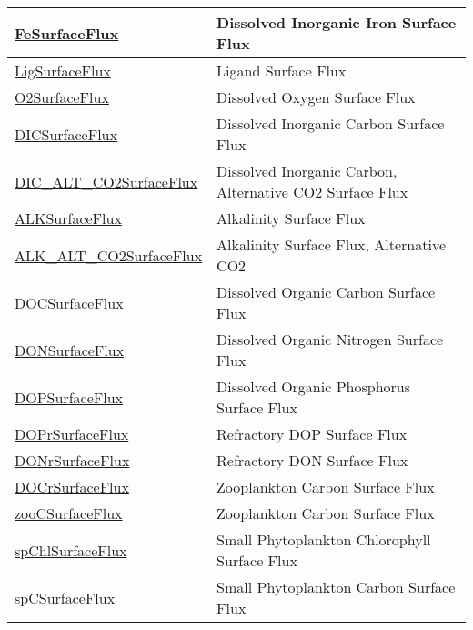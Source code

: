 {\begin{center}
\begin{longtable}{| p{2.0in} | p{4.0in} |}
    \hline
    \hyperref[subsec:var_sec_forcing_FeSurfaceFlux]{FeSurfaceFlux} & Dissolved Inorganic Iron Surface Flux \\
    \hline
    \hyperref[subsec:var_sec_forcing_LigSurfaceFlux]{LigSurfaceFlux} & Ligand Surface Flux \\
    \hline
    \hyperref[subsec:var_sec_forcing_O2SurfaceFlux]{O2SurfaceFlux} & Dissolved Oxygen Surface Flux \\
    \hline
    \hyperref[subsec:var_sec_forcing_DICSurfaceFlux]{DICSurfaceFlux} & Dissolved Inorganic Carbon Surface Flux \\
    \hline
    \hyperref[subsec:var_sec_forcing_DIC_ALT_CO2SurfaceFlux]{DIC\_ALT\_CO2SurfaceFlux} & Dissolved Inorganic Carbon, Alternative CO2 Surface Flux \\
    \hline
    \hyperref[subsec:var_sec_forcing_ALKSurfaceFlux]{ALKSurfaceFlux} & Alkalinity Surface Flux \\
    \hline
    \hyperref[subsec:var_sec_forcing_ALK_ALT_CO2SurfaceFlux]{ALK\_ALT\_CO2SurfaceFlux} & Alkalinity Surface Flux, Alternative CO2 \\
    \hline
    \hyperref[subsec:var_sec_forcing_DOCSurfaceFlux]{DOCSurfaceFlux} & Dissolved Organic Carbon Surface Flux \\
    \hline
    \hyperref[subsec:var_sec_forcing_DONSurfaceFlux]{DONSurfaceFlux} & Dissolved Organic Nitrogen Surface Flux \\
    \hline
    \hyperref[subsec:var_sec_forcing_DOPSurfaceFlux]{DOPSurfaceFlux} & Dissolved Organic Phosphorus Surface Flux \\
    \hline
    \hyperref[subsec:var_sec_forcing_DOPrSurfaceFlux]{DOPrSurfaceFlux} & Refractory DOP Surface Flux \\
    \hline
    \hyperref[subsec:var_sec_forcing_DONrSurfaceFlux]{DONrSurfaceFlux} & Refractory DON Surface Flux \\
    \hline
    \hyperref[subsec:var_sec_forcing_DOCrSurfaceFlux]{DOCrSurfaceFlux} & Zooplankton Carbon Surface Flux \\
    \hline
    \hyperref[subsec:var_sec_forcing_zooCSurfaceFlux]{zooCSurfaceFlux} & Zooplankton Carbon Surface Flux \\
    \hline
    \hyperref[subsec:var_sec_forcing_spChlSurfaceFlux]{spChlSurfaceFlux} & Small Phytoplankton Chlorophyll Surface Flux \\
    \hline
    \hyperref[subsec:var_sec_forcing_spCSurfaceFlux]{spCSurfaceFlux} & Small Phytoplankton Carbon Surface Flux \\

\end{longtable}
\end{center}}

